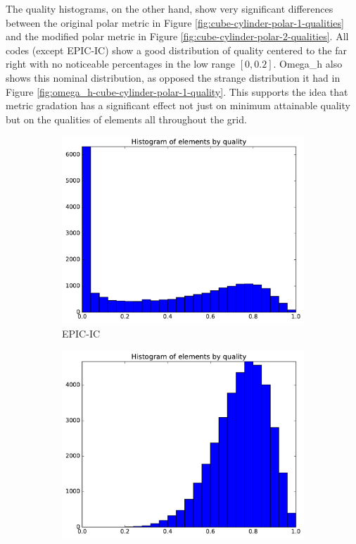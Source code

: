 \documentclass[3p,times,procedia,number]{elsarticle}
\begin{document}
The quality histograms, on the other hand, show very significant differences
between the original polar metric in Figure \ref{fig:cube-cylinder-polar-1-qualities}
and the modified polar metric in Figure \ref{fig:cube-cylinder-polar-2-qualities}.
All codes (except EPIC-IC) show a good distribution of quality centered to the
far right with no noticeable percentages in the low range $[0,0.2]$.
Omega\_h also shows this nominal distribution, as opposed the strange distribution
it had in Figure \ref{fig:omega_h-cube-cylinder-polar-1-quality}.
This supports the idea that metric gradation has a significant effect not just
on minimum attainable quality but on the qualities of elements all throughout the grid.

\begin{figure}
\begin{subfigure}{.16\textwidth}
\centering
\includegraphics[width=\textwidth]{epic-ic-cube-cylinder-polar-2-quality.pdf}
\caption{EPIC-IC}
\end{subfigure}
\begin{subfigure}{.16\textwidth}
\centering
\includegraphics[width=\textwidth]{epic-ics-cube-cylinder-polar-2-quality.pdf}

\end{subfigure}
\end{figure}
\end{document}
